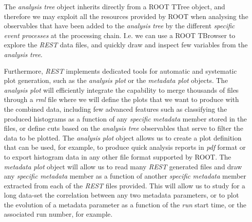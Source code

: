 
The \emph{analysis tree} object inherits directly from a ROOT TTree object, and therefore we may exploit all the resources provided by ROOT when analysing the observables that have been added to the \emph{analysis tree} by the different \emph{specific event processes} at the processing chain. I.e. we can use a ROOT TBrowser to explore the \emph{REST} data files, and quickly draw and inspect few variables from the \emph{analysis tree}. 

Furthermore, \emph{REST} implements dedicated tools for automatic and systematic plot generation, such as the \emph{analysis plot} or the \emph{metadata plot} objects. 
The \emph{analysis plot} will efficiently integrate the capability to merge thousands of files through a \emph{rml} file where we will define the plots that we want to produce with the combined data, including few advanced features such as classifying the produced histograms as a function of any \emph{specific metadata} member stored in the files, or define cuts based on the \emph{analysis tree} observables that serve to filter the data to be plotted. The \emph{analysis plot} object allows us to create a plot definition that can be used, for example, to produce quick analysis reports in \emph{pdf} format or to export histogram data in any other file format supported by ROOT.
The \emph{metadata plot} object will allow us to read many \emph{REST} generated files and draw any \emph{specific metadata} member as a function of another \emph{specific metadata} member extracted from each of the \emph{REST} files provided. This will allow us to study for a long data-set the correlation between any two metadata parameters, or to plot the evolution of a metadata parameter as a function of the \emph{run} start time, or the associated run number, for example.


